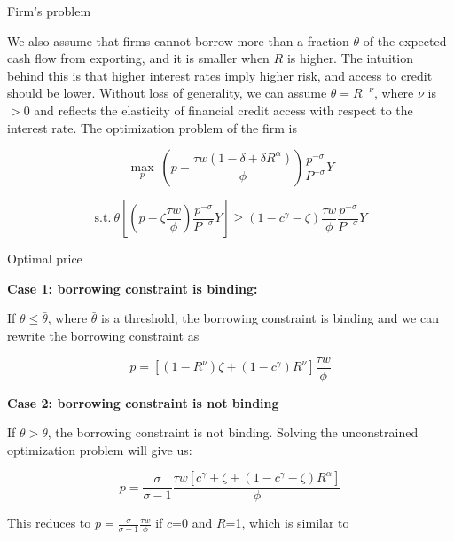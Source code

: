 \documentclass[10pt]{beamer}
\begin{document}
\begin{frame}{Firm's problem}

We also assume that firms cannot borrow more than a fraction $\theta$ of the expected cash flow from exporting, and it is smaller when $R$ is higher. The intuition behind this is that higher interest rates imply higher risk, and access to credit should be lower. Without loss of generality, we can assume $\theta=R^{-\nu}$, where $\nu$ is $>0$ and reflects the elasticity of financial credit access with respect to the interest rate. The optimization problem of the firm is 

$$
\max_{p} \ (p- \frac{\tau w(1-\delta+\delta R^\alpha)}{\phi}) \frac{p^{-\sigma}}{P^{-\sigma}} Y
$$

\begin{equation}
\text{s.t.} \ \theta [(p-\zeta \frac{\tau w}{\phi}) \frac{p^{-\sigma}}{P^{-\sigma}} Y]\geq(1-c^\gamma-\zeta)\frac{\tau w}{\phi} \frac{p^{-\sigma}}{P^{-\sigma}} Y
\end{equation}

\end{frame}



\begin{frame}{Optimal price}

\textbf{Case 1: borrowing constraint is binding: }

If $\theta\leq\bar{\theta}$, where $\bar{\theta}$ is a threshold, the borrowing constraint is binding and we can rewrite the borrowing constraint as 

\begin{equation}
p=[(1-R^{\nu})\zeta+(1-c^\gamma)R^{\nu}] \frac{\tau w}{\phi}
\end{equation}

\textbf{Case 2: borrowing constraint is not binding}

If $\theta>\bar{\theta}$, the borrowing constraint is not binding. Solving the unconstrained optimization problem will give us:

\begin{equation}
p=\frac{\sigma}{\sigma-1}\frac{\tau w [c^\gamma+\zeta+(1-c^\gamma-\zeta) R^\alpha]}{\phi}
\end{equation}

This reduces to $p=\frac{\sigma}{\sigma-1}\frac{\tau w}{\phi}$ if $c$=0 and $R$=1, which is similar to \cite{melitz2003impact} 

\end{frame}
\end{document}
